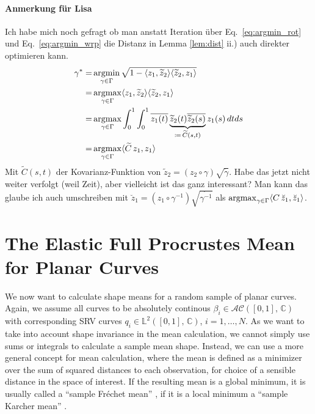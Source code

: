 \paragraph{Anmerkung für Lisa}
Ich habe mich noch gefragt ob man anstatt Iteration über Eq.\ \ref{eq:argmin_rot} und Eq.\ \ref{eq:argmin_wrp} die Distanz in Lemma \ref{lem:dist} ii.) auch direkter optimieren kann.
\begin{align*}
  \gamma^* = & \operatorname*{argmin}_{\gamma \in \Gamma} \sqrt{1 - \langle z_1, \widetilde z_2 \rangle \langle \widetilde z_2, z_1 \rangle } \\
    = & \operatorname*{argmax}_{\gamma \in \Gamma} \langle z_1, \widetilde z_2 \rangle \langle \widetilde z_2, z_1 \rangle \\
    = & \operatorname*{argmax}_{\gamma \in \Gamma} \int_0^1 \int_0^1
    \overline{z_1(t)} \underbrace{\widetilde z_2(t) \overline{\widetilde z_2(s)}}_{\coloneqq \, {\widetilde C}(s,t)} z_1(s) \, dt ds \\
    = & \operatorname*{argmax}_{\gamma \in \Gamma} \langle \widetilde C \, z_1, z_1 \rangle
\end{align*}
Mit $\widetilde C(s,t)$ der Kovarianz-Funktion von $\widetilde z_2 = (z_2 \circ \gamma) \sqrt{\dot\gamma}$.
Habe das jetzt nicht weiter verfolgt (weil Zeit), aber vielleicht ist das ganz interessant?
Man kann das glaube ich auch umschreiben mit $\breve z_1 = (z_1 \circ \gamma^{-1}) \sqrt{\dot{\gamma^{-1}}}$ als $\operatorname*{argmax}_{\gamma \in \Gamma} \langle C \, \breve z_1, \breve z_1 \rangle$.



\section{The Elastic Full Procrustes Mean for Planar Curves}
We now want to calculate shape means for a random sample of planar curves.
Again, we assume all curves to be absolutely continous $\beta_i \in \mathcal{AC}([0,1],\, \mathbb{C})$ with corresponding SRV curves $q_i \in \mathbb{L}^2([0,1],\, \mathbb{C})$, $i=1,\dots,N$.
As we want to take into account shape invariance in the mean calculation, we cannot simply use sums or integrals to calculate a sample mean shape.
Instead, we can use a more general concept for mean calculation, where the mean is defined as a minimizer over the sum of squared distances to each observation, for choice of a sensible distance in the space of interest.
If the resulting mean is a global minimum, it is usually called a \enquote{sample Fr\'echet mean} \parencite{Frechet1948}, if it is a local minimum a \enquote{sample Karcher mean} \parencite{Karcher1977} \parencite[see][111]{DrydenMardia2016}.

